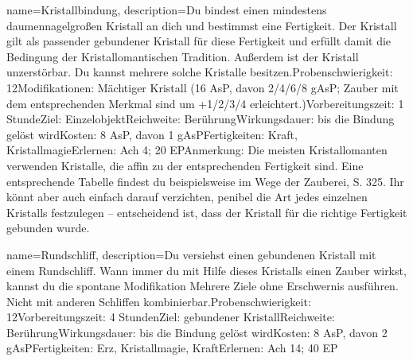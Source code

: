 {
    name={Kristallbindung},
    description={Du bindest einen mindestens daumennagelgroßen Kristall an dich und bestimmst eine Fertigkeit. Der Kristall gilt als passender gebundener Kristall für diese Fertigkeit und erfüllt damit die Bedingung der Kristallomantischen Tradition. Außerdem ist der Kristall unzerstörbar. Du kannst mehrere solche Kristalle besitzen.\newline Probenschwierigkeit: 12\newline Modifikationen: Mächtiger Kristall (16 AsP, davon 2/4/6/8 gAsP; Zauber mit dem entsprechenden Merkmal sind um +1/2/3/4 erleichtert.)\newline Vorbereitungszeit: 1 Stunde\newline Ziel: Einzelobjekt\newline Reichweite: Berührung\newline Wirkungsdauer: bis die Bindung gelöst wird\newline Kosten: 8 AsP, davon 1 gAsP\newline Fertigkeiten: Kraft, Kristallmagie\newline Erlernen: Ach 4; 20 EP\newline Anmerkung: Die meisten Kristallomanten verwenden Kristalle, die affin zu der entsprechenden Fertigkeit sind. Eine entsprechende Tabelle findest du beispielsweise im Wege der Zauberei, S. 325. Ihr könnt aber auch einfach darauf verzichten, penibel die Art jedes einzelnen Kristalls festzulegen – entscheidend ist, dass der Kristall für die richtige Fertigkeit gebunden wurde.}
}


{
    name={Rundschliff},
    description={Du versiehst einen gebundenen Kristall mit einem Rundschliff. Wann immer du mit Hilfe dieses Kristalls einen Zauber wirkst, kannst du die spontane Modifikation Mehrere Ziele ohne Erschwernis ausführen. Nicht mit anderen Schliffen kombinierbar.\newline Probenschwierigkeit: 12\newline Vorbereitungszeit: 4 Stunden\newline Ziel: gebundener Kristall\newline Reichweite: Berührung\newline Wirkungsdauer: bis die Bindung gelöst wird\newline Kosten: 8 AsP, davon 2 gAsP\newline Fertigkeiten: Erz, Kristallmagie, Kraft\newline Erlernen: Ach 14; 40 EP}
}


